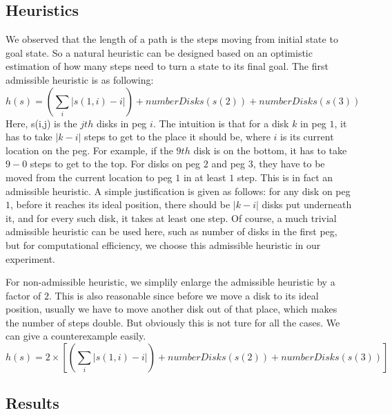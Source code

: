 \subsection{Heuristics}
We observed that the length of a path is the steps moving from initial state to goal state. So a natural heuristic can be designed based on an optimistic estimation of how many steps need to turn a state to its final goal. The first admissible heuristic is as following:
\[
h(s) = (\sum_i |s(1,i)-i| ) + numberDisks(s(2)) + numberDisks(s(3))
\]
Here, s(i,j) is the $jth$ disks in peg $i$. The intuition is that for a disk $k$ in peg $1$, it has to take $|k-i|$ steps to get to the place it should be, where $i$ is its current location on the peg. For example, if the $9th$ disk is on the bottom, it has to take $9-0$ steps to get to the top. For disks on peg $2$ and peg $3$, they have to be moved from the current location to peg $1$ in at least $1$ step. This is in fact an admissible heuristic. A simple justification is given as
follows: for any disk on peg $1$, before it reaches its ideal position, there should be $|k-i|$ disks put underneath it, and for every such disk, it takes at least one step. Of course, a much trivial admissible heuristic can be used here, such as number of disks in the first peg, but for computational efficiency, we choose this admissible heuristic in our experiment.

For non-admissible heuristic, we simplily enlarge the admissible heuristic by a factor of $2$. This is also reasonable since before we move a disk to its ideal position, usually we have to move another disk out of that place, which makes the number of steps double. But obviously this is not ture for all the cases. We can give a counterexample easily. 
\[
h(s) = 2 \times [(\sum_i |s(1,i)-i| ) + numberDisks(s(2)) + numberDisks(s(3))]
\]

\subsection{Results}

